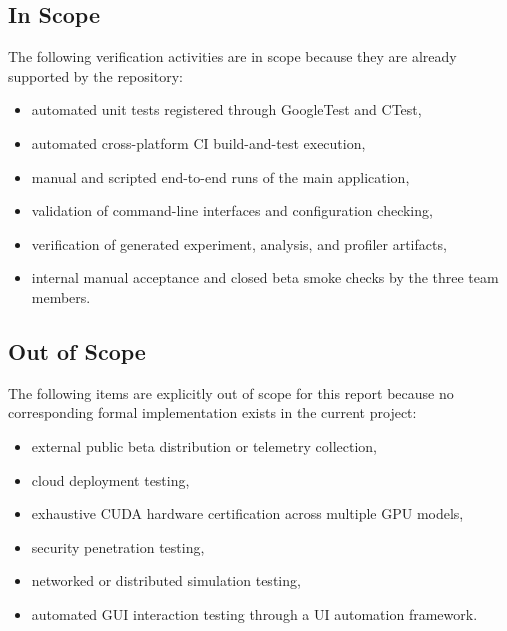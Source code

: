 \subsection{In Scope}

The following verification activities are in scope because they are already supported by the
repository:

\begin{itemize}[nosep]
	\item automated unit tests registered through GoogleTest and CTest,
	\item automated cross-platform CI build-and-test execution,
	\item manual and scripted end-to-end runs of the main application,
	\item validation of command-line interfaces and configuration checking,
	\item verification of generated experiment, analysis, and profiler artifacts,
	\item internal manual acceptance and closed beta smoke checks by the three team members.
\end{itemize}

\subsection{Out of Scope}

The following items are explicitly out of scope for this report because no corresponding
formal implementation exists in the current project:

\begin{itemize}[nosep]
	\item external public beta distribution or telemetry collection,
	\item cloud deployment testing,
	\item exhaustive CUDA hardware certification across multiple GPU models,
	\item security penetration testing,
	\item networked or distributed simulation testing,
	\item automated GUI interaction testing through a UI automation framework.
\end{itemize}
